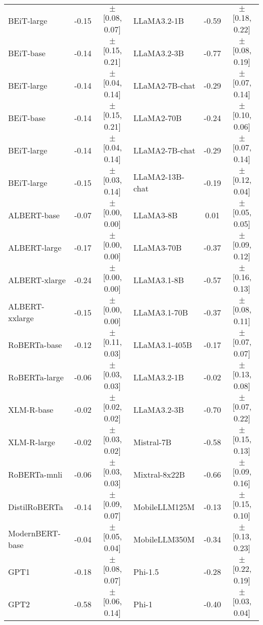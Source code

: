 \begin{table}
\begin{tabular}{lcc|lcc}
    BEiT-large    & -0.15 & $\pm$ [0.08, 0.07] & LLaMA3.2-1B    & -0.59 & $\pm$ [0.18, 0.22] \\ 
    BEiT-base     & -0.14 & $\pm$ [0.15, 0.21] & LLaMA3.2-3B    & -0.77 & $\pm$ [0.08, 0.19] \\ 
    BEiT-large    & -0.14 & $\pm$ [0.04, 0.14] & LLaMA2-7B-chat & -0.29 & $\pm$ [0.07, 0.14] \\ 
    BEiT-base     & -0.14 & $\pm$ [0.15, 0.21] & LLaMA2-70B     & -0.24 & $\pm$ [0.10, 0.06] \\ 
    BEiT-large    & -0.14 & $\pm$ [0.04, 0.14] & LLaMA2-7B-chat & -0.29 & $\pm$ [0.07, 0.14] \\ 
    BEiT-large    & -0.15 & $\pm$ [0.03, 0.14] & LLaMA2-13B-chat & -0.19 & $\pm$ [0.12, 0.04] \\ 
    ALBERT-base   & -0.07 & $\pm$ [0.00, 0.00] & LLaMA3-8B      &  0.01 & $\pm$ [0.05, 0.05] \\ 
    ALBERT-large  & -0.17 & $\pm$ [0.00, 0.00] & LLaMA3-70B     & -0.37 & $\pm$ [0.09, 0.12] \\ 
    ALBERT-xlarge & -0.24 & $\pm$ [0.00, 0.00] & LLaMA3.1-8B    & -0.57 & $\pm$ [0.16, 0.13] \\ 
    ALBERT-xxlarge & -0.15 & $\pm$ [0.00, 0.00] & LLaMA3.1-70B   & -0.37 & $\pm$ [0.08, 0.11] \\ 
    RoBERTa-base  & -0.12 & $\pm$ [0.11, 0.03] & LLaMA3.1-405B  & -0.17 & $\pm$ [0.07, 0.07] \\ 
    RoBERTa-large & -0.06 & $\pm$ [0.03, 0.03] & LLaMA3.2-1B    & -0.02 & $\pm$ [0.13, 0.08] \\ 
    XLM-R-base    & -0.02 & $\pm$ [0.02, 0.02] & LLaMA3.2-3B    & -0.70 & $\pm$ [0.07, 0.22] \\ 
    XLM-R-large   & -0.02 & $\pm$ [0.03, 0.02] & Mistral-7B     & -0.58 & $\pm$ [0.15, 0.13] \\ 
    RoBERTa-mnli  & -0.06 & $\pm$ [0.03, 0.03] & Mixtral-8x22B  & -0.66 & $\pm$ [0.09, 0.16] \\ 
    DistilRoBERTa & -0.14 & $\pm$ [0.09, 0.07] & MobileLLM125M  & -0.13 & $\pm$ [0.15, 0.10] \\ 
    ModernBERT-base & -0.04 & $\pm$ [0.05, 0.04] & MobileLLM350M  & -0.34 & $\pm$ [0.13, 0.23] \\ 
    GPT1          & -0.18 & $\pm$ [0.08, 0.07] & Phi-1.5        & -0.28 & $\pm$ [0.22, 0.19] \\ 
    GPT2          & -0.58 & $\pm$ [0.06, 0.14] & Phi-1          & -0.40 & $\pm$ [0.03, 0.04] \\ 
    \bottomrule
\end{tabular}
\end{table}

